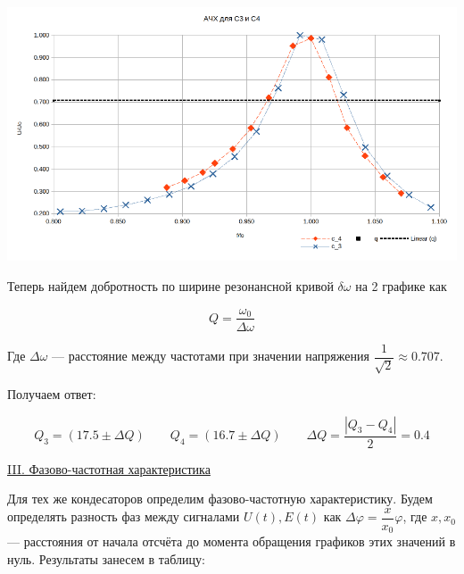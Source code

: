 \documentclass{article}
\begin{document}
\begin{center}
    \includegraphics[width = 17 cm]{ACH_34.png}
\end{center}

Теперь найдем добротность по ширине резонансной кривой $ \delta\omega $ на 2 графике как 

\begin{equation}
    Q = \frac{\omega_{0}}{\Delta\omega}
\end{equation}  

Где $ \Delta\omega $ --- расстояние между частотами при значении напряжения $ \dfrac{1}{\sqrt{2}} \approx 0.707 $.

Получаем ответ: 

\begin{equation}
    Q_3 = (17.5 \pm \Delta Q) \qquad Q_4 = (16.7 \pm \Delta Q) \qquad \Delta Q = \frac{|Q_3 - Q_{4}|}{2} = 0.4
\end{equation}

\begin{center}
    \underline{\large {\RN{3}. Фазово-частотная характеристика}}
\end{center}

Для тех же кондесаторов определим фазово-частотную характеристику. Будем определять разность фаз между сигналами $ U(t), E(t) $ как $ \Delta\varphi = \dfrac{x}{x_0}\varphi $, где $ x, x_0 $ --- расстояния от начала отсчёта до момента обращения графиков этих значений в нуль. Результаты занесем в таблицу:
\end{document}
